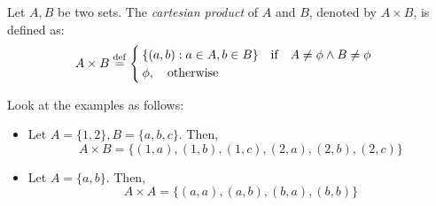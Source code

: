 \documentclass[11pt]{scrartcl}
\begin{document}
    \begin{definition}
        Let \(A, B\) be two sets. The \emph{cartesian product} of \(A\) and \(B\), denoted by \(A \times B\), is defined as: \[A \times B \overset{\mathrm{def}}{=} \begin{cases}
            \{(a, b) : a \in A, b \in B\} \quad \text{if} \quad A \neq \phi \wedge B \neq \phi \\
            \phi, \quad \text{otherwise}
        \end{cases}\]
    \end{definition}
    \begin{example}
        Look at the examples as follows:
        \begin{itemize}
            \item Let \(A = \{1, 2\}, B = \{a, b, c\}\). Then, \[A \times B = \{(1, a), (1, b), (1, c), (2, a), (2, b), (2, c)\}\]
            \item Let \(A = \{a, b\}\). Then,\[A \times A = \{(a, a), (a, b), (b, a), (b, b)\}\] 
        \end{itemize}
    \end{example}
\end{document}
